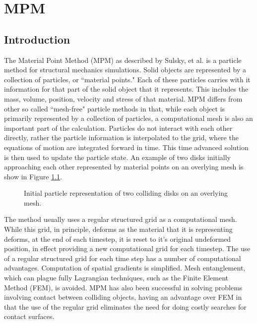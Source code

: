 \chapter{MPM} \label{Sec:MPM}

\section{Introduction}
The Material Point Method (MPM) as described by Sulsky, et al.
\cite{Sulsky1994,Sulsky1995} is a
particle method for structural mechanics simulations.  Solid objects
are represented by a collection of particles, or ``material points."  Each
of these particles carries with it information for that part of the
solid object that it represents.  This includes the mass, volume,
position, velocity and stress of that material.  MPM differs from other
so called ``mesh-free" particle methods in that, while each object is primarily 
represented by a collection of particles, a computational mesh is
also an important part of the calculation.  Particles do not interact
with each other directly, rather the particle information is interpolated
to the grid, where the equations of motion are integrated forward in time.
This time advanced solution is then used to update the particle state.
An example of two disks initially approaching each other represented by
material points on an overlying mesh is show in Figure \ref{fig-disks_init}.

\begin{figure}[h]
  \centering
  \caption{\label{fig-disks_init} Initial particle representation of two
                                colliding disks on an overlying mesh.}
\end{figure}

The method usually uses a regular structured grid as a computational mesh.
While this grid, in principle, deforms as the material that it is representing
deforms, at the end of each timestep, it is reset to it's original undeformed
position, in effect providing a new computational grid for each timestep.
The use of a regular structured grid for each time step has a number of
computational advantages.  Computation of spatial gradients is simplified.
Mesh entanglement, which can plague fully Lagrangian techniques, such as
the Finite Element Method (FEM), is avoided.  MPM has also been successful
in solving problems involving contact between colliding objects, having an
advantage over FEM in that the use of the regular grid eliminates the
need for doing costly searches for contact surfaces\cite{Bard2001}.

